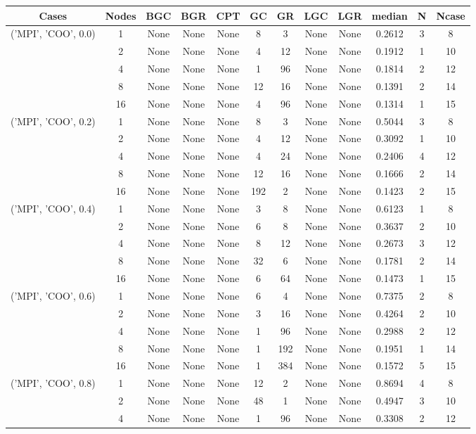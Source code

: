 \begin{tabular}{cccccccccccc}
\hline
Cases & Nodes& BGC& BGR& CPT& GC& GR& LGC& LGR& median & N & Ncase \\
\hline
\multirow{5}{*}{('MPI', 'COO', 0.0)}& 1& None& None& None& 8& 3& None& None& 0.2612& 3& 8\\
& 2& None& None& None& 4& 12& None& None& 0.1912& 1& 10\\
& 4& None& None& None& 1& 96& None& None& 0.1814& 2& 12\\
& 8& None& None& None& 12& 16& None& None& 0.1391& 2& 14\\
& 16& None& None& None& 4& 96& None& None& 0.1314& 1& 15\\
\hline
\multirow{5}{*}{('MPI', 'COO', 0.2)}& 1& None& None& None& 8& 3& None& None& 0.5044& 3& 8\\
& 2& None& None& None& 4& 12& None& None& 0.3092& 1& 10\\
& 4& None& None& None& 4& 24& None& None& 0.2406& 4& 12\\
& 8& None& None& None& 12& 16& None& None& 0.1666& 2& 14\\
& 16& None& None& None& 192& 2& None& None& 0.1423& 2& 15\\
\hline
\multirow{5}{*}{('MPI', 'COO', 0.4)}& 1& None& None& None& 3& 8& None& None& 0.6123& 1& 8\\
& 2& None& None& None& 6& 8& None& None& 0.3637& 2& 10\\
& 4& None& None& None& 8& 12& None& None& 0.2673& 3& 12\\
& 8& None& None& None& 32& 6& None& None& 0.1781& 2& 14\\
& 16& None& None& None& 6& 64& None& None& 0.1473& 1& 15\\
\hline
\multirow{5}{*}{('MPI', 'COO', 0.6)}& 1& None& None& None& 6& 4& None& None& 0.7375& 2& 8\\
& 2& None& None& None& 3& 16& None& None& 0.4264& 2& 10\\
& 4& None& None& None& 1& 96& None& None& 0.2988& 2& 12\\
& 8& None& None& None& 1& 192& None& None& 0.1951& 1& 14\\
& 16& None& None& None& 1& 384& None& None& 0.1572& 5& 15\\
\hline
\multirow{5}{*}{('MPI', 'COO', 0.8)}& 1& None& None& None& 12& 2& None& None& 0.8694& 4& 8\\
& 2& None& None& None& 48& 1& None& None& 0.4947& 3& 10\\
& 4& None& None& None& 1& 96& None& None& 0.3308& 2& 12\\

\end{tabular}
